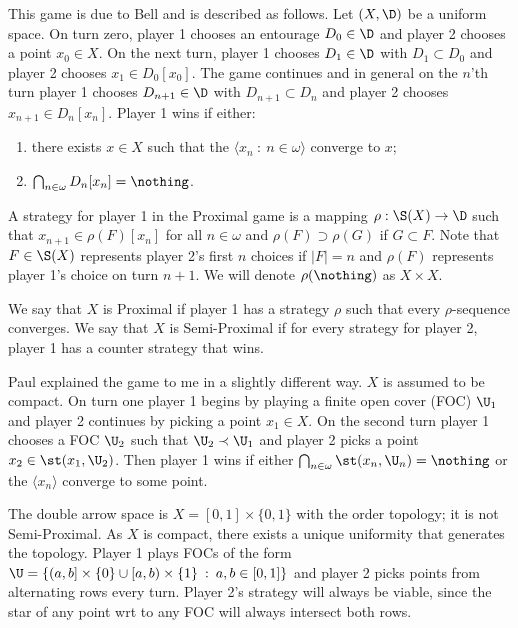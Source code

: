 \documentclass{article}
\begin{document}
This game is due to Bell and is described as follows. Let \((X, \D)\) be a uniform space. On turn zero, player 1 chooses an entourage \(D_0 \in \D\) and player 2 chooses a point \(x_0 \in X\). On the next turn, player 1 chooses \(D_1 \in \D\) with \(D_1 \subset D_0\) and player 2 chooses \(x_1 \in D_0[x_0]\). The game continues and in general on the \(n\)'th turn player 1 chooses \(D_{n + 1} \in \D\) with \(D_{n + 1} \subset D_n\) and player 2 chooses \(x_{n + 1} \in D_n[x_n]\). Player 1 wins if either: 

\begin{enumerate}
    \item there exists \(x \in X\) such that the \(\langle x_n \: : \: n \in \omega\rangle\) converge to \(x\);
    \item \(\bigcap_{n \in \omega}D_n[x_n] = \nothing\).
\end{enumerate}
\begin{defn}
    A strategy for player 1 in the Proximal game is a mapping \(\rho: \S(X) \to \D\) such that \(x_{n + 1} \in \rho(F)[x_n]\) for all \(n \in \omega\) and \(\rho(F) \supset \rho(G)\) if \(G \subset F\). Note that \(F \in \S(X)\) represents player 2's first \(n\) choices if \(|F| = n\) and \(\rho(F)\) represents player 1's choice on turn \(n + 1\). We will denote \(\rho(\nothing)\) as \(X \times X\). 
\end{defn}
\begin{defn}
    We say that \(X\) is Proximal if player 1 has a strategy \(\rho\) such that every \(\rho\)-sequence converges. We say that \(X\) is Semi-Proximal if for every strategy for player 2, player 1 has a counter strategy that wins.
\end{defn}
\begin{rem}
    Paul explained the game to me in a slightly different way. \(X\) is assumed to be compact. On turn one player 1 begins by playing a finite open cover (FOC) \(\U_1\) and player 2 continues by picking a point \(x_1 \in X\). On the second turn player 1 chooses a FOC \(\U_2\) such that \(\U_2 \prec \U_1\) and player 2 picks a point \(x_2 \in \st(x_1, \U_2)\). Then player 1 wins if either \(\bigcap_{n \in \omega}\st(x_n, \U_n) = \nothing\) or the \(\langle x_n \rangle\) converge to some point. 
\end{rem}
\begin{exam}
    The double arrow space is \(X = [0, 1]\times\{0, 1\}\) with the order topology; it is not Semi-Proximal. As \(X\) is compact, there exists a unique uniformity that generates the topology. Player 1 plays FOCs of the form \(\U = \{(a, b] \times \{0\} \cup [a, b) \times \{1\} \: : \: a,b \in [0, 1]\}\) and player 2 picks points from alternating rows every turn. Player 2's strategy will always be viable, since the star of any point wrt to any FOC will always intersect both rows.
\end{exam}
\end{document}
